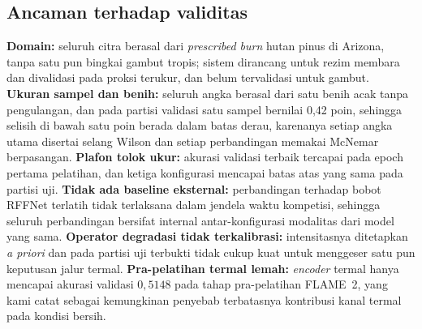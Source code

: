 \subsection{Ancaman terhadap validitas}

\textbf{Domain:} seluruh citra berasal dari \emph{prescribed burn} hutan pinus di
Arizona, tanpa satu pun bingkai gambut tropis; sistem dirancang untuk rezim
membara dan divalidasi pada proksi terukur, dan belum tervalidasi untuk gambut.
\textbf{Ukuran sampel dan benih:} seluruh angka berasal dari satu benih acak
tanpa pengulangan, dan pada partisi validasi satu sampel bernilai 0{,}42 poin,
sehingga selisih di bawah satu poin berada dalam batas derau, karenanya setiap
angka utama disertai selang Wilson dan setiap perbandingan memakai McNemar
berpasangan. \textbf{Plafon tolok ukur:} akurasi validasi terbaik tercapai pada
epoch pertama pelatihan, dan ketiga konfigurasi mencapai batas atas yang sama
pada partisi uji. \textbf{Tidak ada baseline eksternal:} perbandingan terhadap
bobot RFFNet terlatih tidak terlaksana dalam jendela waktu kompetisi, sehingga
seluruh perbandingan bersifat internal antar-konfigurasi modalitas dari model
yang sama. \textbf{Operator degradasi tidak terkalibrasi:} intensitasnya
ditetapkan \emph{a priori} dan pada partisi uji terbukti tidak cukup kuat untuk
menggeser satu pun keputusan jalur termal. \textbf{Pra-pelatihan termal lemah:}
\emph{encoder} termal hanya mencapai akurasi validasi $0{,}5148$ pada tahap
pra-pelatihan FLAME~2, yang kami catat sebagai kemungkinan penyebab terbatasnya
kontribusi kanal termal pada kondisi bersih.
